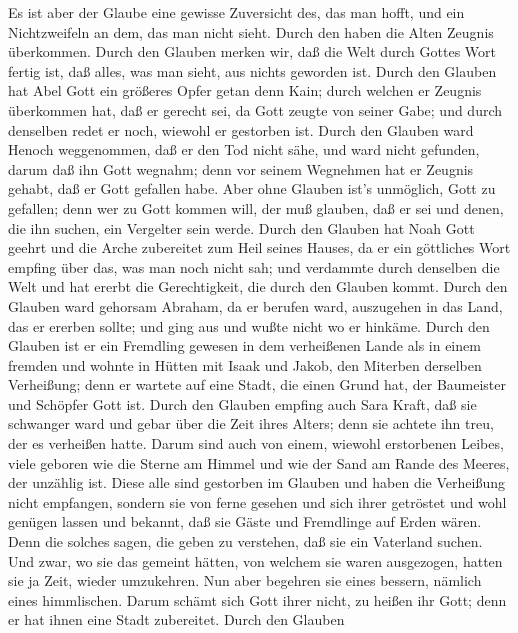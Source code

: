  Es ist aber der Glaube eine gewisse Zuversicht des, das man
hofft, und ein Nichtzweifeln an dem, das man nicht sieht. 
Durch den haben die Alten Zeugnis überkommen.  Durch den
Glauben merken wir, daß die Welt durch Gottes Wort fertig ist, daß
alles, was man sieht, aus nichts geworden ist.  Durch den
Glauben hat Abel Gott ein größeres Opfer getan denn Kain; durch welchen
er Zeugnis überkommen hat, daß er gerecht sei, da Gott zeugte von seiner
Gabe; und durch denselben redet er noch, wiewohl er gestorben ist.
 Durch den Glauben ward Henoch weggenommen, daß er den Tod
nicht sähe, und ward nicht gefunden, darum daß ihn Gott wegnahm; denn
vor seinem Wegnehmen hat er Zeugnis gehabt, daß er Gott gefallen habe.
 Aber ohne Glauben ist's unmöglich, Gott zu gefallen; denn
wer zu Gott kommen will, der muß glauben, daß er sei und denen, die ihn
suchen, ein Vergelter sein werde.  Durch den Glauben hat
Noah Gott geehrt und die Arche zubereitet zum Heil seines Hauses, da er
ein göttliches Wort empfing über das, was man noch nicht sah; und
verdammte durch denselben die Welt und hat ererbt die Gerechtigkeit, die
durch den Glauben kommt.  Durch den Glauben ward gehorsam
Abraham, da er berufen ward, auszugehen in das Land, das er ererben
sollte; und ging aus und wußte nicht wo er hinkäme.  Durch
den Glauben ist er ein Fremdling gewesen in dem verheißenen Lande als in
einem fremden und wohnte in Hütten mit Isaak und Jakob, den Miterben
derselben Verheißung;  denn er wartete auf eine Stadt, die
einen Grund hat, der Baumeister und Schöpfer Gott ist. 
Durch den Glauben empfing auch Sara Kraft, daß sie schwanger ward und
gebar über die Zeit ihres Alters; denn sie achtete ihn treu, der es
verheißen hatte.  Darum sind auch von einem, wiewohl
erstorbenen Leibes, viele geboren wie die Sterne am Himmel und wie der
Sand am Rande des Meeres, der unzählig ist.  Diese alle
sind gestorben im Glauben und haben die Verheißung nicht empfangen,
sondern sie von ferne gesehen und sich ihrer getröstet und wohl genügen
lassen und bekannt, daß sie Gäste und Fremdlinge auf Erden wären.
 Denn die solches sagen, die geben zu verstehen, daß sie
ein Vaterland suchen.  Und zwar, wo sie das gemeint hätten,
von welchem sie waren ausgezogen, hatten sie ja Zeit, wieder umzukehren.
 Nun aber begehren sie eines bessern, nämlich eines
himmlischen. Darum schämt sich Gott ihrer nicht, zu heißen ihr Gott;
denn er hat ihnen eine Stadt zubereitet.  Durch den Glauben
